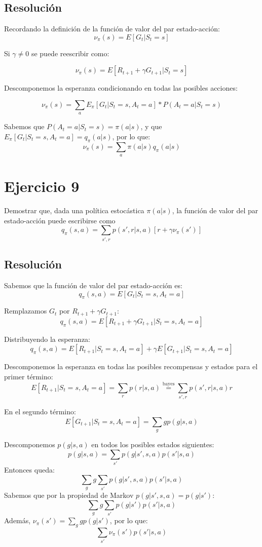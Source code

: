 \documentclass[12pt,a4paper]{article}
\begin{document}
\subsection{Resolución}

Recordando la definición de la función de valor del par estado-acción:
$$ \nu_\pi(s) = E[G_t | S_t = s] $$

Si $\gamma \neq 0$ se puede reescribir como:

$$ \nu_\pi(s) = E[R_{t+1} + \gamma G_{t+1} | S_t = s] $$

Descomponemos la esperanza condicionando en todas las posibles acciones:

$$ \nu_\pi(s) = \sum_a E_\pi[G_t|S_t = s,A_t = a] * P(A_t = a|S_t = s) $$

Sabemos que $P(A_t = a|S_t = s) = \pi(a|s)$, y que $E_\pi[G_t|S_t = s,A_t = a] = q_\pi(a|s)$, por lo que:
$$ \nu_\pi(s) = \sum_a \pi(a|s) q_\pi(a|s) $$

\section{Ejercicio 9}

Demostrar que, dada una política estocástica $\pi(a|s)$, la función de valor del par
estado-acción puede escribirse como
$$ q_\pi(s,a) = \sum_{s',r} p(s',r|s,a)[r + \gamma \nu_\pi(s')] $$

\subsection{Resolución}

Sabemos que la función de valor del par estado-acción es:
$$ q_\pi(s,a) = E[G_t | S_t = s, A_t = a] $$

Remplazamos $G_t$ por $R_{t+1} + \gamma G_{t+1}$:
$$ q_\pi(s,a) = E[R_{t+1} + \gamma G_{t+1} | S_t = s, A_t = a] $$

Distribuyendo la esperanza:
$$ q_\pi(s,a) = E[R_{t+1} | S_t = s, A_t = a] + \gamma E[G_{t+1} | S_t = s, A_t = a] $$

Descomponemos la esperanza en todas las posibles recompensas y estados para
el primer término:
$$ E[R_{t+1} | S_t = s, A_t = a] = \sum_r p(r|s,a)   \stackrel{\text{bayes}}{=} \sum_{s',r} p(s',r|s,a) r $$

En el segundo término:
$$ E[G_{t+1} | S_t = s, A_t = a] = \sum_g g p(g|s,a)$$

Descomponemos $p(g|s,a)$ en todos los posibles estados siguientes:
$$ p(g|s,a) = \sum_{s'} p(g|s',s,a) p(s'|s,a) $$
Entonces queda:
$$ \sum_g g \sum_{s'} p(g|s',s,a) p(s'|s,a) $$
Sabemos que por la propiedad de Markov $p(g|s',s,a) = p(g|s')$:
$$ \sum_g g \sum_{s'} p(g|s') p(s'|s,a) $$
Además, $\nu_\pi(s') = \sum_g g p(g|s')$, por lo que:
$$ \sum_{s'} \nu_\pi(s') p(s'|s,a) $$
\end{document}
